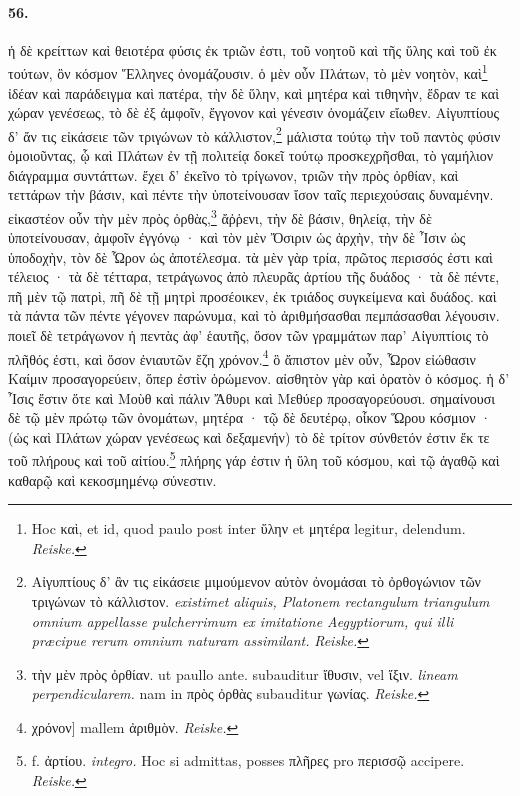 \documentclass[a4paper, 11pt, oneside, polutonikogreek, german]{article}
\begin{document}
\paragraph{56.}
ἡ δὲ κρείττων καὶ θειοτέρα φύσις ἐκ τριῶν ἐστι, τοῦ νοητοῦ καὶ τῆς ὕλης καὶ τοῦ ἐκ τούτων, ὃν κόσμον Ἕλληνες ὀνομάζουσιν. ὁ μὲν οὖν Πλάτων, τὸ μὲν νοητὸν, καὶ\footnote{Hoc καὶ, et id, quod paulo post inter ὕλην et μητέρα legitur, delendum. \emph{Reiske.}} ἰδέαν καὶ παράδειγμα καὶ πατέρα, τὴν δὲ ὕλην, καὶ μητέρα καὶ τιθηνὴν, ἕδραν τε καὶ χώραν γενέσεως, τὸ δὲ ἐξ ἀμφοῖν, ἔγγονον καὶ γένεσιν ὀνομάζειν εἴωθεν. Αἰγυπτίους δ' ἄν τις εἰκάσειε τῶν τριγώνων τὸ κάλλιστον,\footnote{Αἰγυπτίους δ' ἂν τις εἰκάσειε μιμούμενον αὐτὸν ὀνομάσαι τὸ ὀρθογώνιον τῶν τριγώνων τὸ κάλλιστον. \emph{existimet aliquis, Platonem rectangulum triangulum omnium appellasse pulcherrimum ex imitatione Aegyptiorum, qui illi præcipue rerum omnium naturam assimilant.} \emph{Reiske.}} μάλιστα τούτῳ τὴν τοῦ παντὸς φύσιν ὁμοιοῦντας, ᾧ καὶ Πλάτων ἐν τῇ πολιτείᾳ δοκεῖ τούτῳ προσκεχρῆσθαι, τὸ γαμήλιον διάγραμμα συντάττων. ἔχει δ' ἐκεῖνο τὸ τρίγωνον, τριῶν τὴν πρὸς ὀρθίαν, καὶ τεττάρων τὴν βάσιν, καὶ πέντε τὴν ὑποτείνουσαν ἴσον ταῖς περιεχούσαις δυναμένην. εἰκαστέον οὖν τὴν μὲν πρὸς ὀρθὰς,\footnote{τὴν μὲν πρὸς ὀρθίαν. ut paullo ante. subauditur ἴθυσιν, vel ἴξιν. \emph{lineam perpendicularem.} nam in πρὸς ὀρθὰς subauditur γωνίας. \emph{Reiske.} } ἄῤῥενι, τὴν δὲ βάσιν, θηλείᾳ, τὴν δὲ ὑποτείνουσαν, ἀμφοῖν ἐγγόνῳ · καὶ τὸν μὲν Ὄσιριν ὡς ἀρχὴν, τὴν δὲ Ἶσιν ὡς ὑποδοχὴν, τὸν δὲ Ὧρον ὡς ἀποτέλεσμα. τὰ μὲν γὰρ τρία, πρῶτος περισσός ἐστι καὶ τέλειος · τὰ δὲ τέτταρα, τετράγωνος ἀπὸ πλευρᾶς ἀρτίου τῆς δυάδος · τὰ δὲ πέντε, πῆ μὲν τῷ πατρὶ, πῆ δὲ τῇ μητρὶ προσέοικεν, ἐκ τριάδος συγκείμενα καὶ δυάδος. καὶ τὰ πάντα τῶν πέντε γέγονεν παρώνυμα, καὶ τὸ ἀριθμήσασθαι πεμπάσασθαι λέγουσιν. ποιεῖ δὲ τετράγωνον ἡ πεντὰς ἀφ' ἑαυτῆς, ὅσον τῶν γραμμάτων παρ' Αἰγυπτίοις τὸ πλῆθός ἐστι, καὶ ὅσον ἐνιαυτῶν ἔζη χρόνον.\footnote{χρόνον] mallem ἀριθμὸν. \emph{Reiske.}} ὃ ἄπιστον μὲν οὖν, Ὧρον εἰώθασιν Καίμιν προσαγορεύειν, ὅπερ ἐστὶν ὁρώμενον. αἰσθητὸν γὰρ καὶ ὁρατὸν ὁ κόσμος. ἡ δ' Ἶσις ἔστιν ὅτε καὶ Μοὺθ καὶ πάλιν Ἄθυρι καὶ Μεθύερ προσαγορεύουσι. σημαίνουσι δὲ τῷ μὲν πρώτῳ τῶν ὀνομάτων, μητέρα · τῷ δὲ δευτέρῳ, οἶκον Ὥρου κόσμιον · (ὡς καὶ Πλάτων χώραν γενέσεως καὶ δεξαμενήν) τὸ δὲ τρίτον σύνθετόν ἐστιν ἔκ τε τοῦ πλήρους καὶ τοῦ αἰτίου.\footnote{f. ἀρτίου. \emph{integro.} Hoc si admittas, posses πλῆρες pro περισσῷ accipere. \emph{Reiske.}} πλήρης γάρ ἐστιν ἡ ὕλη τοῦ κόσμου, καὶ τῷ ἀγαθῷ καὶ καθαρῷ καὶ κεκοσμημένῳ σύνεστιν.
\end{document}
